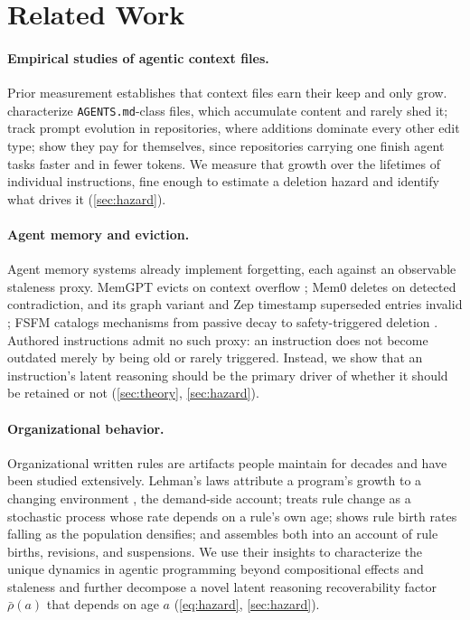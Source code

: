 \section{Related Work}
\label{sec:related}


\paragraph{Empirical studies of agentic context files.}
Prior measurement establishes that context files earn their keep and only grow.
\citet{chatlatanagulchai2025agentreadmes} characterize \texttt{AGENTS.md}-class files, which
accumulate content and rarely shed it; \citet{tafreshipour2025promptinthewild} track prompt evolution in
repositories, where additions dominate every other edit type;
\citet{lulla2026contextfiles} show they pay for themselves, since repositories carrying one finish
agent tasks faster and in fewer tokens. We measure that growth over the lifetimes of individual
instructions, fine enough to estimate a deletion hazard and identify what drives it
(\autoref{sec:hazard}).

\paragraph{Agent memory and eviction.}
Agent memory systems already implement forgetting, each against an observable staleness proxy.
MemGPT evicts on context overflow \citep{packer2023memgpt}; Mem0 deletes on detected contradiction, and
its graph variant and Zep timestamp superseded entries invalid
\citep{chhikara2025mem0, rasmussen2025zep}; FSFM catalogs mechanisms from passive decay to safety-triggered
deletion \citep{fsfm2026selective}. Authored instructions admit no such proxy: an instruction does not
become outdated merely by being old or rarely triggered. Instead, we show that an instruction's latent
reasoning should be the primary driver of whether it should be retained or not (\autoref{sec:theory},
\autoref{sec:hazard}).

\paragraph{Organizational behavior.}
Organizational written rules are artifacts people maintain for decades and have been studied extensively.
Lehman's laws attribute a program's growth to a changing environment \citep{lehman1980laws}, the demand-side
account; \citet{zhou1993dynamics} treats rule change as a stochastic process whose rate depends on a rule's
own age; \citet{schulz1998limits} shows rule birth rates falling as the population densifies; and
\citet{march2000dynamics} assembles both into an account of rule births, revisions, and suspensions. We use
their insights to characterize the unique dynamics in agentic programming beyond compositional effects and
staleness and further decompose a novel latent reasoning recoverability factor $\bar \rho(a)$ that depends on age $a$
(\autoref{eq:hazard}, \autoref{sec:hazard}).

